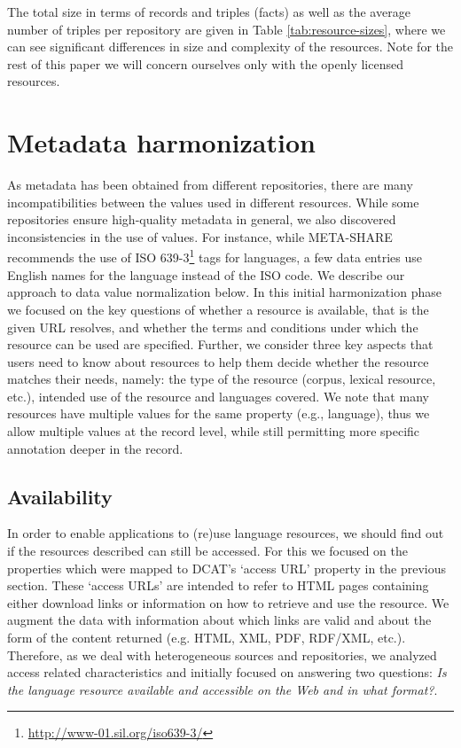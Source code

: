\documentclass[11pt]{article}
\begin{document}
The total size in terms of records and triples (facts) as well as the average
number of triples per repository are given in Table \ref{tab:resource-sizes}, where
we can see significant differences in size and complexity of the resources. Note
for the rest of this paper we will concern ourselves only with the openly
licensed resources.

\section{Metadata harmonization}

\label{harmonization}

As metadata has been obtained from different repositories, there are many
incompatibilities between the values used in different resources. 
While some repositories ensure high-quality metadata in general, we also
discovered inconsistencies in the use of values. For instance, while META-SHARE
recommends the use of ISO 639-3\footnote{\url{http://www-01.sil.org/iso639-3/}} tags for
languages, a few data entries use English names for the language
instead of the ISO code. We describe our approach to data value normalization
below. In this initial harmonization phase we focused on the key
questions of whether a resource is available, that is the given URL
resolves, and whether the terms and conditions under which the resource can be
used are specified. Further, we consider three key aspects that users need to
know about resources to help them decide whether the resource matches their
needs, namely: the type of the resource (corpus, lexical resource, etc.),
 intended use of the resource and languages covered. We note that many resources
have multiple values for the same property (e.g., language), thus we allow
multiple values at the record level, while still permitting more specific
annotation deeper in the record.

\subsection{Availability}

In order to enable applications to (re)use language resources, we should find
out if the resources described can still be accessed. For this we focused on the
properties which were mapped to DCAT's `access URL' property in the previous
section. These `access URLs' are intended to refer to HTML pages
containing either download links or information on how to retrieve and use the
resource. We augment the data with information about which links are valid and
about the form of the content returned (e.g. HTML, XML, PDF, RDF/XML, etc.).
Therefore, as we deal with heterogeneous sources and repositories, we 
analyzed access related characteristics and initially focused on answering two 
questions: \textit{Is the language resource available and accessible on the Web
and in what format?}.
\end{document}
